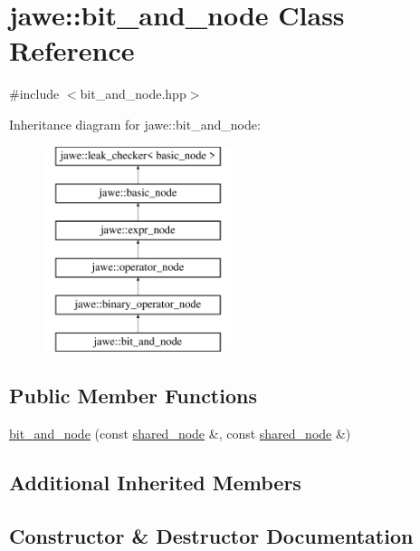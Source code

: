 \hypertarget{classjawe_1_1bit__and__node}{}\section{jawe\+:\+:bit\+\_\+and\+\_\+node Class Reference}
\label{classjawe_1_1bit__and__node}


{\ttfamily \#include $<$bit\+\_\+and\+\_\+node.\+hpp$>$}

Inheritance diagram for jawe\+:\+:bit\+\_\+and\+\_\+node\+:\begin{figure}[H]
\begin{center}
\leavevmode
\includegraphics[height=6.000000cm]{classjawe_1_1bit__and__node}
\end{center}
\end{figure}
\subsection*{Public Member Functions}
\begin{DoxyCompactItemize}
\item 
\hyperlink{classjawe_1_1bit__and__node_a2e3a28111fa7dd0ec8d209d5211fec99}{bit\+\_\+and\+\_\+node} (const \hyperlink{namespacejawe_a3f307481d921b6cbb50cc8511fc2b544}{shared\+\_\+node} \&, const \hyperlink{namespacejawe_a3f307481d921b6cbb50cc8511fc2b544}{shared\+\_\+node} \&)
\end{DoxyCompactItemize}
\subsection*{Additional Inherited Members}


\subsection{Constructor \& Destructor Documentation}
\mbox{\label{classjawe_1_1bit__and__node_a2e3a28111fa7dd0ec8d209d5211fec99}} 
